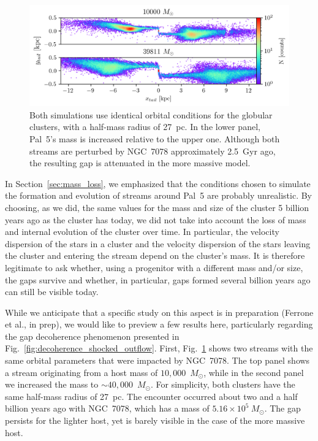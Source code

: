         \begin{figure}
            \centering
            \includegraphics[width=\linewidth]{images/gap_no_more.png}
            \caption{Both simulations use identical orbital conditions for the globular clusters, with a half-mass radius of 27~pc. In the lower panel, Pal~5's mass is increased relative to the upper one. Although both streams are perturbed by NGC~7078 approximately 2.5~Gyr ago, the resulting gap is attenuated in the more massive model.}
            \label{fig:gap_no_more}
        \end{figure}

        In Section~\ref{sec:mass_loss}, we emphasized that the conditions chosen to simulate the formation and evolution of streams around Pal~5 are probably unrealistic. By choosing, as we did, the same values for the mass and size of the cluster 5 billion years ago as the cluster has today, we did not take into account the loss of mass and internal evolution of the cluster over time. In particular, the velocity dispersion of the stars in a cluster and the velocity dispersion of the stars leaving the cluster and entering the stream depend on the cluster's mass. It is therefore legitimate to ask whether, using a progenitor with a different mass and/or size, the gaps survive and whether, in particular, gaps formed several billion years ago can still be visible today. 

        While we anticipate that a specific study on this aspect is in preparation (Ferrone et al., in prep), we would like to preview a few results here, particularly regarding the gap decoherence phenomenon presented in Fig.~\ref{fig:decoherence_shocked_outflow}. First, Fig.~\ref{fig:gap_no_more} shows two streams with the same orbital parameters that were impacted by NGC~7078. The top panel shows a stream originating from a host mass of $10,000$~$M_\odot$, while in the second panel we increased the mass to $\sim40,000$~$M_\odot$. For simplicity, both clusters have the same half-mass radius of 27~pc. The encounter occurred about two and a half billion years ago with NGC~7078, which has a mass of $5.16\times10^{5}~M_\odot$. The gap persists for the lighter host, yet is barely visible in the case of the more massive host.

